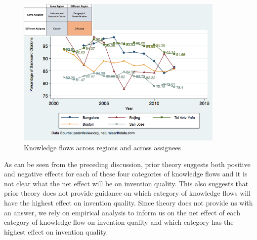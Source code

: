 \documentclass[12pt,letterpaper]{article}
\begin{document}
\begin{figure}[h!]
\begin{centering}
  \caption{Knowledge flows across regions and across assignees}
  \label{fig:SMSDiffRegionDiffAssigneeFlows}
  \includegraphics[width=0.90\textwidth]{SMSDiffRegionDiffAssigneeFlows}
\end{centering}
\end{figure}

As can be seen from the preceding discussion, prior theory suggests both positive and negative effects for each of these four categories of knowledge flows and it is not clear what the net effect will be on invention quality. This also suggests that prior theory does not provide guidance on which category of knowledge flows will have the highest effect on invention quality.  Since theory does not provide us with an answer, we rely on empirical analysis to inform us on the net effect of each category of knowledge flow on invention quality and which category has the highest effect on invention quality. \par
\end{document}
